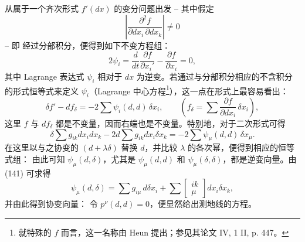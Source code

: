 从属于一个齐次形式 $f'(dx)$ 的变分问题出发 -- 其中假定
\[
\left|\frac{\partial^2 f}{\partial dx_i\,\partial dx_k}\right|\ne0
\]
-- 即
经过分部积分，便得到如下不变方程组：
\[
 2\psi_i=\frac{d}{dt}\frac{\partial f}{\partial x_i'}-\frac{\partial f}{\partial x_i}=0,
\]
其中 Lagrange 表达式 $\psi_i$ 相对于 $dx$ 为逆变。若通过与分部积分相应的不含积分的形式恒等式来定义 $\psi_i$（Lagrange 中心方程\footnote{就特殊的 $f$ 而言，这一名称由 Heun 提出；参见其论文 IV, 1 II, p. 447。}），这一点在形式上最容易看出：
\[
 \delta f'-df_\delta=-2\sum\psi_i(d,d)\,\delta x_i,
 \qquad
 \left(f_\delta=\sum\frac{\partial f}{\partial dx_i}\,\delta x_i\right),
\]
这里 $f$ 与 $df_\delta$ 都是不变量，因而右端也是不变量。特别地，对于二次形式可得
\[
 \delta\sum g_{ik}dx_i dx_k-2d\sum g_{ik}dx_i\delta x_k
 =-2\sum\psi_\mu(d,d)\,\delta x_\mu.
\]
在这里以与之协变的 $(d+\lambda\delta)$ 替换 $d$，并比较 $\lambda$ 的各次幂，便得到相应的恒等式组：
由此可知 $\psi_\mu(d,\delta)$，尤其是 $\psi_\mu(d,d)$ 和 $\psi_\mu(\delta,\delta)$，都是逆变向量。由 (141) 可求得
\[
 \psi_\mu(d,\delta)=\sum g_{i\mu}\,d\delta x_i+
 \sum\left[\begin{smallmatrix}ik\\ \mu\end{smallmatrix}\right]dx_i\delta x_k,
\]
并由此得到协变向量：
令 $p^\nu(d,d)=0$，便显然给出测地线的方程。

